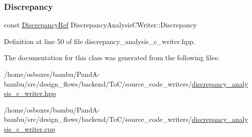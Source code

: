 \subsubsection{\texorpdfstring{Discrepancy}{Discrepancy}}
{\footnotesize\ttfamily const \hyperlink{Discrepancy_8hpp_a9fb5a8938b4eeaafdaf7707f583f0193}{Discrepancy\+Ref} Discrepancy\+Analysis\+C\+Writer\+::\+Discrepancy\hspace{0.3cm}{\ttfamily [protected]}}



Definition at line 50 of file discrepancy\+\_\+analysis\+\_\+c\+\_\+writer.\+hpp.



The documentation for this class was generated from the following files\+:\begin{DoxyCompactItemize}
\item 
/home/osboxes/bambu/\+Pand\+A-\/bambu/src/design\+\_\+flows/backend/\+To\+C/source\+\_\+code\+\_\+writers/\hyperlink{discrepancy__analysis__c__writer_8hpp}{discrepancy\+\_\+analysis\+\_\+c\+\_\+writer.\+hpp}\item 
/home/osboxes/bambu/\+Pand\+A-\/bambu/src/design\+\_\+flows/backend/\+To\+C/source\+\_\+code\+\_\+writers/\hyperlink{discrepancy__analysis__c__writer_8cpp}{discrepancy\+\_\+analysis\+\_\+c\+\_\+writer.\+cpp}\end{DoxyCompactItemize}
